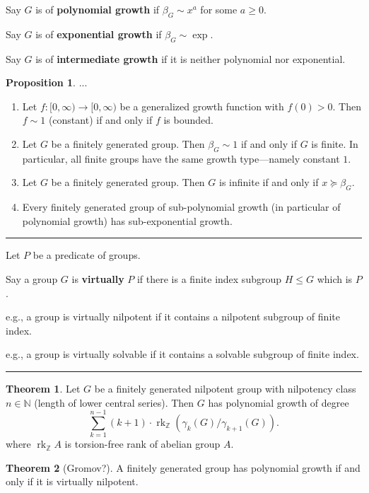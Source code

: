 \documentclass[12pt]{article}
\newcommand{\keyword}[1]{\textbf{#1}}
\newcommand{\sepline}{\rule{\textwidth}{0.4pt}}
\theoremstyle{definition}
\newtheorem{theorem}{Theorem}
\newtheorem{proposition}{Proposition}
\newcommand{\N}{\mathbb{N}}
\newcommand{\Z}{\mathbb{Z}}
\newcommand{\<}{\left\langle}
\renewcommand{\>}{\right\rangle}
\DeclareMathOperator{\rk}{rk}
\begin{document}
Say $G$ is of \keyword{polynomial growth} if $\beta_G \sim x^a$ for some $a \geq 0$.

Say $G$ is of \keyword{exponential growth} if $\beta_G \sim \exp$.

Say $G$ is of \keyword{intermediate growth} if it is neither polynomial nor exponential.

\begin{proposition}
    ...
    \begin{enumerate}[(1)]
        \item Let $f : [0, \infty) \to [0, \infty)$ be a generalized growth function with $f(0) > 0$.
        Then $f \sim 1$ (constant) if and only if $f$ is bounded.
        \item Let $G$ be a finitely generated group.
        Then $\beta_G \sim 1$ if and only if $G$ is finite.
        In particular, all finite groups have the same growth type---namely constant $1$.
        \item Let $G$ be a finitely generated group.
        Then $G$ is infinite if and only if $x \succeq \beta_G$.
        \item Every finitely generated group of sub-polynomial growth (in particular of polynomial growth) has sub-exponential growth.
    \end{enumerate}
\end{proposition}

\sepline

Let $P$ be a predicate of groups.

Say a group $G$ is \keyword{virtually} $P$ if there is a finite index subgroup $H \leq G$ which is $P$.

e.g., a group is virtually nilpotent if it contains a nilpotent subgroup of finite index.

e.g., a group is virtually solvable if it contains a solvable subgroup of finite index.

\sepline

\begin{theorem}
    Let $G$ be a finitely generated nilpotent group with nilpotency class $n \in \N$ (length of lower central series).
    Then $G$ has polynomial growth of degree
    \[
        \sum_{k=1}^{n-1} (k + 1) \cdot \rk_\Z(\gamma_k(G)/\gamma_{k+1}(G)).
    \]
    where $\rk_\Z A$ is torsion-free rank of abelian group $A$.
\end{theorem}

\begin{theorem}[Gromov?]
    A finitely generated group has polynomial growth if and only if it is virtually nilpotent.
\end{theorem}
\end{document}
